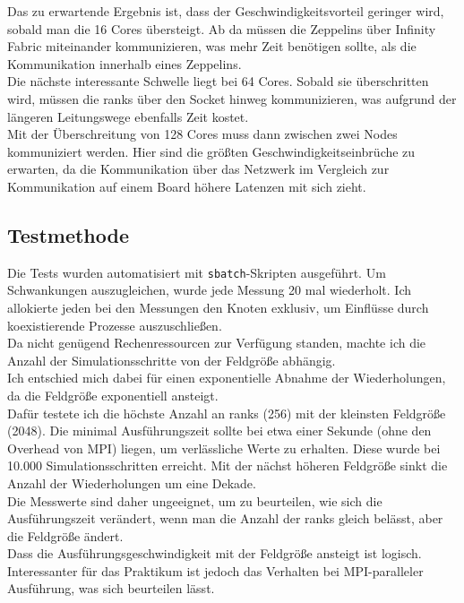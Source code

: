 \documentclass[german,plainarticle,hyperref,utf8]{zihpub}
\begin{document}
	Das zu erwartende Ergebnis ist, dass der Geschwindigkeitsvorteil geringer wird, sobald man die 16 Cores übersteigt. Ab da müssen die Zeppelins über Infinity Fabric miteinander kommunizieren, was mehr Zeit benötigen sollte, als die Kommunikation innerhalb eines Zeppelins.\\
	
	Die nächste interessante Schwelle liegt bei 64 Cores. Sobald sie überschritten wird, müssen die ranks über den Socket hinweg kommunizieren, was aufgrund der längeren Leitungswege ebenfalls Zeit kostet.\\
	
	Mit der Überschreitung von 128 Cores muss dann zwischen zwei Nodes kommuniziert werden. Hier sind die größten Geschwindigkeitseinbrüche zu erwarten, da die Kommunikation über das Netzwerk im Vergleich zur Kommunikation auf einem Board höhere Latenzen mit sich zieht.
	\subsection{Testmethode}
	Die Tests wurden automatisiert mit \texttt{sbatch}-Skripten ausgeführt. Um Schwankungen auszugleichen, wurde jede Messung 20 mal wiederholt. Ich allokierte jeden bei den Messungen den Knoten exklusiv, um Einflüsse durch koexistierende Prozesse auszuschließen.\\
	Da nicht genügend Rechenressourcen zur Verfügung standen, machte ich die Anzahl der Simulationsschritte von der Feldgröße abhängig.\\
	Ich entschied mich dabei für einen exponentielle Abnahme der Wiederholungen, da die Feldgröße exponentiell ansteigt.\\
	
	Dafür testete ich die höchste Anzahl an ranks (256) mit der kleinsten Feldgröße (2048). Die minimal Ausführungszeit sollte bei etwa einer Sekunde (ohne den Overhead von MPI) liegen, um verlässliche Werte zu erhalten. Diese wurde bei 10.000 Simulationsschritten erreicht. Mit der nächst höheren Feldgröße sinkt die Anzahl der Wiederholungen um eine Dekade.\\
	
	Die Messwerte sind daher ungeeignet, um zu beurteilen, wie sich die Ausführungszeit verändert, wenn man die Anzahl der ranks gleich belässt, aber die Feldgröße ändert.\\
	Dass die Ausführungsgeschwindigkeit mit der Feldgröße ansteigt ist logisch. Interessanter für das Praktikum ist jedoch das Verhalten bei MPI-paralleler Ausführung, was sich beurteilen lässt.\\
	
\end{document}
